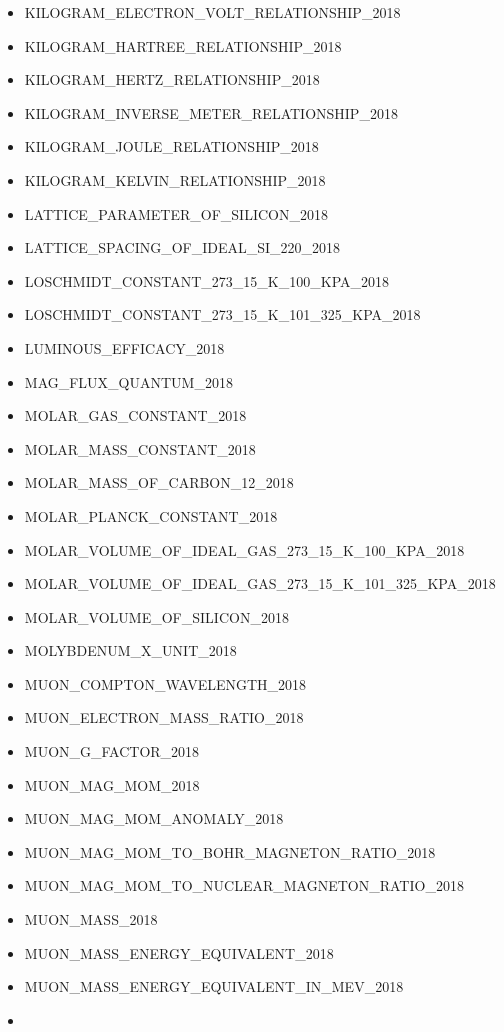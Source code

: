\begin{itemize}
  KILOGRAM\_ATOMIC\_MASS\_UNIT\_RELATIONSHIP\_2018
\item
  KILOGRAM\_ELECTRON\_VOLT\_RELATIONSHIP\_2018
\item
  KILOGRAM\_HARTREE\_RELATIONSHIP\_2018
\item
  KILOGRAM\_HERTZ\_RELATIONSHIP\_2018
\item
  KILOGRAM\_INVERSE\_METER\_RELATIONSHIP\_2018
\item
  KILOGRAM\_JOULE\_RELATIONSHIP\_2018
\item
  KILOGRAM\_KELVIN\_RELATIONSHIP\_2018
\item
  LATTICE\_PARAMETER\_OF\_SILICON\_2018
\item
  LATTICE\_SPACING\_OF\_IDEAL\_SI\_220\_2018
\item
  LOSCHMIDT\_CONSTANT\_273\_15\_K\_100\_KPA\_2018
\item
  LOSCHMIDT\_CONSTANT\_273\_15\_K\_101\_325\_KPA\_2018
\item
  LUMINOUS\_EFFICACY\_2018
\item
  MAG\_FLUX\_QUANTUM\_2018
\item
  MOLAR\_GAS\_CONSTANT\_2018
\item
  MOLAR\_MASS\_CONSTANT\_2018
\item
  MOLAR\_MASS\_OF\_CARBON\_12\_2018
\item
  MOLAR\_PLANCK\_CONSTANT\_2018
\item
  MOLAR\_VOLUME\_OF\_IDEAL\_GAS\_273\_15\_K\_100\_KPA\_2018
\item
  MOLAR\_VOLUME\_OF\_IDEAL\_GAS\_273\_15\_K\_101\_325\_KPA\_2018
\item
  MOLAR\_VOLUME\_OF\_SILICON\_2018
\item
  MOLYBDENUM\_X\_UNIT\_2018
\item
  MUON\_COMPTON\_WAVELENGTH\_2018
\item
  MUON\_ELECTRON\_MASS\_RATIO\_2018
\item
  MUON\_G\_FACTOR\_2018
\item
  MUON\_MAG\_MOM\_2018
\item
  MUON\_MAG\_MOM\_ANOMALY\_2018
\item
  MUON\_MAG\_MOM\_TO\_BOHR\_MAGNETON\_RATIO\_2018
\item
  MUON\_MAG\_MOM\_TO\_NUCLEAR\_MAGNETON\_RATIO\_2018
\item
  MUON\_MASS\_2018
\item
  MUON\_MASS\_ENERGY\_EQUIVALENT\_2018
\item
  MUON\_MASS\_ENERGY\_EQUIVALENT\_IN\_MEV\_2018
\item

\end{itemize}
